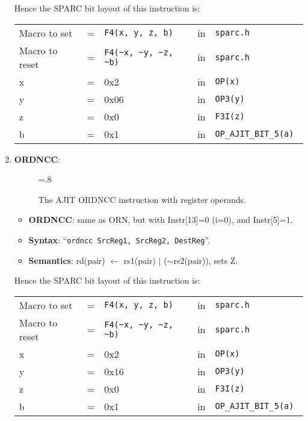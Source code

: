 \begin{enumerate}
  Hence the SPARC bit layout of this instruction is:

  \begin{tabular}[h]{lclcl}
    Macro to set   &=&  \verb|F4(x, y, z, b)|     &in& \verb|sparc.h|     \\
    Macro to reset &=&  \verb|F4(~x, ~y, ~z, ~b)| &in& \verb|sparc.h|     \\
    x              &=& 0x2                        &in& \verb|OP(x) | \\
    y              &=& 0x06                       &in& \verb|OP3(y) | \\
    z              &=& 0x0                        &in& \verb|F3I(z) | \\
    b              &=& 0x1                        &in& \verb|OP_AJIT_BIT_5(a) |
  \end{tabular}

\item \textbf{ORDNCC}:\\
  \begin{center}
    \begin{figure}[h]
      \centering
      \epsfxsize=.8\linewidth
      \caption{The AJIT ORDNCC instruction  with register operands.}
      \label{fig:ajit:ordncc:insn}
    \end{figure}
  \end{center}
  \begin{itemize}
  \item []\textbf{ORDNCC}: same as ORN, but with Instr[13]=0 (i=0), and
    Instr[5]=1.
  \item []\textbf{Syntax}: ``\texttt{ordncc  SrcReg1, SrcReg2, DestReg}''.
  \item []\textbf{Semantics}: rd(pair) $\leftarrow$ rs1(pair) $\vert$
    ($\sim$rs2(pair)), sets Z.
  \end{itemize}

  Hence the SPARC bit layout of this instruction is:

  \begin{tabular}[h]{lclcl}
    Macro to set   &=&  \verb|F4(x, y, z, b)|     &in& \verb|sparc.h|     \\
    Macro to reset &=&  \verb|F4(~x, ~y, ~z, ~b)| &in& \verb|sparc.h|     \\
    x              &=& 0x2                        &in& \verb|OP(x) | \\
    y              &=& 0x16                       &in& \verb|OP3(y) | \\
    z              &=& 0x0                        &in& \verb|F3I(z) | \\
    b              &=& 0x1                        &in& \verb|OP_AJIT_BIT_5(a) |
  \end{tabular}


\end{enumerate}
